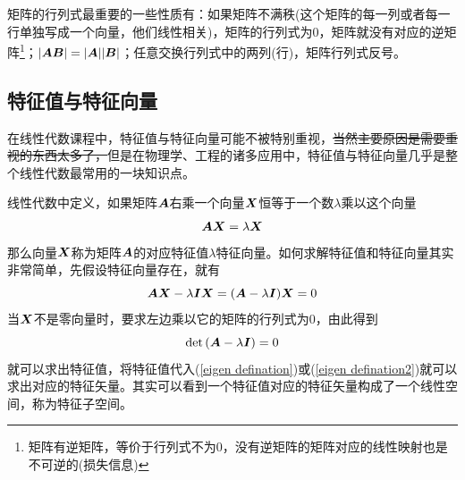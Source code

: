 \documentclass[12pt,a4paper,openany,twoside]{book}
\numberwithin{equation}{section}
\begin{document}
            矩阵的行列式最重要的一些性质有：如果矩阵不满秩(这个矩阵的每一列或者每一行单独写成一个向量，他们线性相关)，矩阵的行列式为0，矩阵就没有对应的逆矩阵\footnote{矩阵有逆矩阵，等价于行列式不为0，没有逆矩阵的矩阵对应的线性映射也是不可逆的(损失信息)}；$\abs{\vb*{A B}}=\abs{\vb*{A}}\abs{\vb*{B}}$；任意交换行列式中的两列(行)，矩阵行列式反号。

          \subsection{特征值与特征向量}
            在线性代数课程中，特征值与特征向量可能不被特别重视，\sout{当然主要原因是需要重视的东西太多了，}但是在物理学、工程的诸多应用中，特征值与特征向量几乎是整个线性代数最常用的一块知识点。

            线性代数中定义，如果矩阵$\vb*{A}$右乘一个向量$\vb*{X}$恒等于一个数$\lambda$乘以这个向量
            \begin{equation}
              \vb*{AX}=\lambda\vb*{X}
              \label{eigen defination}
            \end{equation}
            那么向量$\vb*{X}$称为矩阵$\vb*{A}$的对应特征值$\lambda$特征向量。如何求解特征值和特征向量其实非常简单，先假设特征向量存在，就有
            \begin{equation}
              \vb*{AX}-\lambda\vb*{I}\vb*{X}=\qty(\vb*{A}-\lambda\vb*{I})\vb*{X}=0
              \label{eigen defination2}
            \end{equation}
            当$\vb*{X}$不是零向量时，要求左边乘以它的矩阵的行列式为0，由此得到
            \begin{equation}
              \det\qty(\vb*{A}-\lambda\vb*{I})=0
              \label{eigen equ}
            \end{equation}
            就可以求出特征值，将特征值代入(\ref{eigen defination})或(\ref{eigen defination2})就可以求出对应的特征矢量。其实可以看到一个特征值对应的特征矢量构成了一个线性空间，称为特征子空间。
\end{document}
